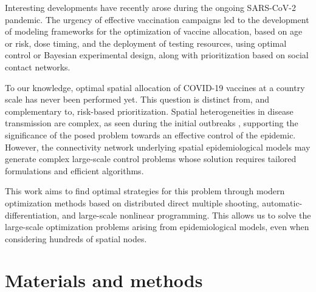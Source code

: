 Interesting developments have recently arose during the ongoing SARS-CoV-2 pandemic\cite[-10\baselineskip]{Fitzpatrick:OptimizingAgespecificVaccination:2021, Thul:StochasticOptimizationVaccine:2021,Moore:VaccinationNonPharmaceuticalInterventions:2021}. The urgency of effective vaccination campaigns led to the development of modeling frameworks for the optimization of vaccine allocation, based on age or risk, dose timing\cite[-4\baselineskip]{Saad-Roy:EpidemiologicalEvolutionaryConsiderations:2021, Kadire:DelayedSecondDose:2021}, and the deployment of testing resources, using optimal control\cite{Acemoglu:OptimalAdaptiveTesting:2021} or Bayesian experimental design\cite{Chatzimanolakis:OptimalAllocationLimited:2020}, along with prioritization based on social contact networks\cite{Chen:PrioritizingAllocationCOVID19:2021}. 

To our knowledge, optimal spatial allocation of COVID-19 vaccines at a country scale has never been performed yet. This question is distinct from, and complementary to, risk-based prioritization. Spatial heterogeneities in disease transmission are complex, as seen during the initial outbreaks%
, supporting the significance of the posed problem towards an effective control of the epidemic. However, the connectivity network underlying spatial epidemiological models may generate complex large-scale control problems whose solution requires tailored formulations and efficient algorithms.  

This work aims to find optimal strategies for this problem through modern optimization methods based on distributed direct multiple shooting, automatic-differentiation, and large-scale nonlinear programming\cite{Bock:MultipleShootingAlgorithm:1984,Savorgnan:MultipleShootingDistributed:2011,Andersson:CasADiSoftwareFramework:2018,Wachter:ImplementationInteriorpointFilter:2006}. This allows us to solve the large-scale optimization problems arising from epidemiological models, even when considering hundreds of spatial nodes. 


\section{Materials and methods} \label{sec:matmet}

